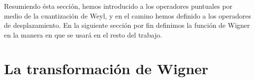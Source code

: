\documentclass[a4paper,11pt]{report}
\DeclareMathOperator{\Op}{Op}
\begin{document}
  Resumiendo ésta sección, hemos introducido a los
  operadores puntuales por medio de la cuantización de Weyl,
  y en el camino hemos definido a los operadores de
  desplazamiento.  En la siguiente sección por fin definimos
  la función de Wigner en la manera en que se usará en el
  resto del trabajo.


  \section{La transformación de Wigner}
\end{document}
